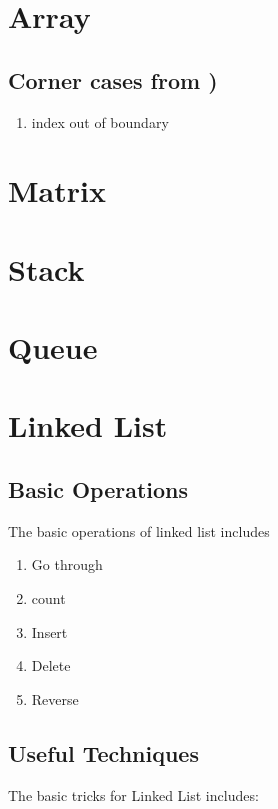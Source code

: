 \chapter{ Array }

\section {  Corner cases from )}
\begin{enumerate}
    \item index out of boundary 


\end{enumerate}

\chapter{ Matrix }

\chapter{ Stack }

\chapter{ Queue }

\chapter{ Linked List }

\section{ Basic Operations  }
The basic operations of linked list includes
\begin{enumerate}
    \item Go through

    \item count

    \item Insert

    \item Delete

    \item Reverse

\end{enumerate}

\section{ Useful Techniques  }
The basic tricks for Linked List includes:

